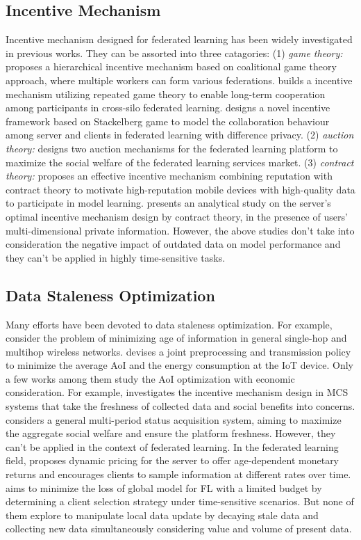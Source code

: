 \documentclass{article}
\theoremstyle{plain}
\theoremstyle{definition}
\theoremstyle{remark}
\begin{document}
\subsection{Incentive Mechanism}
Incentive mechanism designed for federated learning has been widely investigated in previous works.
They can be assorted into three catagories:
(1) \textit{game theory:} 
\cite{lim2020hierarchical}  proposes a hierarchical incentive mechanism based on coalitional game theory approach, where multiple workers can form various federations.
\cite{zhang2022enabling} builds a incentive mechanism utilizing repeated game theory to enable long-term cooperation among participants in cross-silo federated learning.
\cite{huang2024collaboration} designs a novel incentive framework based on Stackelberg game to model the collaboration behaviour among server and clients in federated learning with difference privacy.
(2) \textit{auction theory:} 
\cite{jiao2020toward} designs two auction mechanisms for the federated learning platform to maximize the social welfare of the federated learning services market.
(3) \textit{contract theory:} 
\cite{kang2019incentive} proposes an effective incentive mechanism combining reputation with contract theory to motivate high-reputation mobile devices with high-quality data to participate in model learning.
\cite{ding2020optimal} presents an analytical study on the server's optimal incentive mechanism design by contract theory, in the presence of users' multi-dimensional private information.
However, the above studies don't take into consideration the negative impact of outdated data on model performance and they can't be applied in highly time-sensitive tasks.

\subsection{Data Staleness Optimization}
Many efforts have been devoted to data staleness optimization.
For example, \cite{tripathi2021age} consider the problem of minimizing age of information in general single-hop and multihop wireless networks.
\cite{fang2021computing} devises a joint preprocessing and transmission policy to minimize the average AoI and the energy consumption at the IoT device.
Only a few works among them study the AoI optimization with economic consideration. For example, \cite{xiao2023aoi} investigates the incentive mechanism design in MCS systems that take the freshness of collected data and social benefits into concerns.
\cite{wang2021taming} considers a general multi-period status acquisition system, aiming to maximize the aggregate social welfare and ensure the platform freshness.
However, they can't be applied in the context of federated learning.
In the federated learning field, \cite{wang2019dynamic} proposes dynamic pricing for the server to offer age-dependent monetary returns and encourages clients to sample information at different rates over time.
\cite{wu2023towards} aims to minimize the loss of global model for FL with a limited budget by determining a client selection strategy under time-sensitive scenarios.
But none of them explore to manipulate local data update by decaying stale data and collecting new data simultaneously considering value and volume of present data. 
\end{document}
